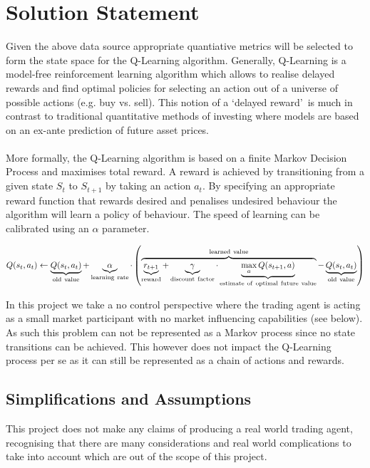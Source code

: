 \documentclass[dvips,12pt]{article}
\begin{document}
\section{Solution Statement}
Given the above data source appropriate quantiative metrics will be selected to form the state space for the Q-Learning algorithm\cite{sutton1998}. Generally, Q-Learning is a model-free reinforcement learning algorithm which allows to realise delayed rewards and find optimal policies for selecting an action out of a universe of possible actions (e.g. buy vs. sell). This notion of a \lq delayed reward\rq ~is much in contrast to traditional quantitative methods of investing where models are based on an ex-ante prediction of future asset prices.
\\\\
More formally, the Q-Learning algorithm is based on a finite Markov Decision Process and maximises total reward. A reward is achieved by transitioning from a given state $S_t$ to $S_{t+1}$ by taking an action $a_t$. By specifying an appropriate reward function that rewards desired and penalises undesired behaviour the algorithm will learn a policy of behaviour. The speed of learning can be calibrated using an $\alpha$ parameter.

\begin{equation}
	Q(s_{t},a_{t}) \leftarrow \underbrace{Q(s_{t},a_{t})}_{\rm old~value} + \underbrace{\alpha}_{\rm learning~rate} \cdot \left( \overbrace{\underbrace{r_{t+1}}_{\rm reward} + \underbrace{\gamma}_{\rm discount~factor} \cdot \underbrace{\max_{a}Q(s_{t+1}, a)}_{\rm estimate~of~optimal~future~value}}^{\rm learned~value} - \underbrace{Q(s_{t},a_{t})}_{\rm old~value} \right)
\end{equation}

In this project we take a no control perspective where the trading agent is acting as a small market participant with no market influencing capabilities (see below). As such this problem can not be represented as a Markov process since no state transitions can be achieved. This however does not impact the Q-Learning process per se as it can still be represented as a chain of actions and rewards.

\subsection{Simplifications and Assumptions}
This project does not make any claims of producing a real world trading agent, recognising that there are many considerations and real world complications to take into account which are out of the scope of this project.
\end{document}
